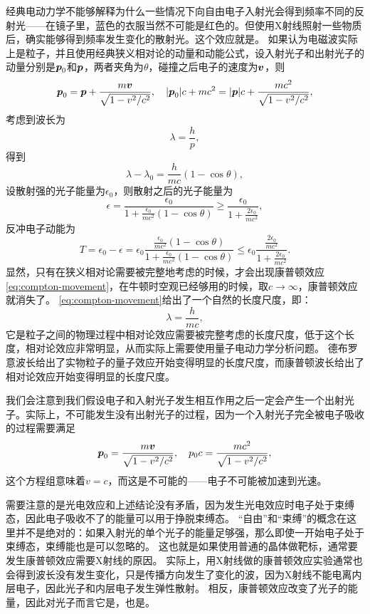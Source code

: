 经典电动力学不能够解释为什么一些情况下向自由电子入射光会得到频率不同的反射光——在镜子里，蓝色的衣服当然不可能是红色的。但使用X射线照射一些物质后，确实能够得到频率发生变化的散射光。这个效应就是。
如果认为电磁波实际上是粒子，并且使用经典狭义相对论的动量和动能公式，设入射光子和出射光子的动量分别是$\vb*{p}_0$和$\vb*{p}$，两者夹角为$\theta$，碰撞之后电子的速度为$\vb*{v}$，则
\[
    \vb*{p}_0 = \vb*{p} + \frac{m \vb*{v}}{\sqrt{1 - v^2/c^2}}, \quad \abs{\vb*{p}_0} c + m c^2 = \abs{\vb*{p}} c + \frac{m c^2}{\sqrt{1 - v^2/c^2}},
\]
考虑到波长为
\[
    \lambda = \frac{h}{p},
\]
得到
\begin{equation}
    \lambda - \lambda_0 = \frac{h}{mc} (1 - \cos \theta),
    \label{eq:compton-movement}
\end{equation}
设散射强的光子能量为$\epsilon_0$，则散射之后的光子能量为
\begin{equation}
    \epsilon = \frac{\epsilon_0}{1 + \frac{\epsilon_0}{m c^2} (1 - \cos \theta)} \geq \frac{\epsilon_0}{1 + \frac{2\epsilon_0}{m c^2}},
\end{equation}
反冲电子动能为
\begin{equation}
    T = \epsilon_0 - \epsilon = \epsilon_0 \frac{\frac{\epsilon_0}{mc^2}(1-\cos \theta)}{1+\frac{\epsilon_0}{mc^2}(1-\cos \theta)} \leq \epsilon_0 \frac{\frac{2 \epsilon_0}{mc^2}}{1+\frac{2 \epsilon_0}{mc^2}}.
\end{equation}
显然，只有在狭义相对论需要被完整地考虑的时候，才会出现康普顿效应\eqref{eq:compton-movement}，在牛顿时空观已经够用的时候，取$c \to \infty$，康普顿效应就消失了。
\eqref{eq:compton-movement}给出了一个自然的长度尺度，即：
\begin{equation}
    \lambda = \frac{h}{mc},
\end{equation}
它是粒子之间的物理过程中相对论效应需要被完整考虑的长度尺度，低于这个长度，相对论效应非常明显，从而实际上需要使用量子电动力学分析问题。
德布罗意波长给出了实物粒子的量子效应开始变得明显的长度尺度，而康普顿波长给出了相对论效应开始变得明显的长度尺度。

我们会注意到我们假设电子和入射光子发生相互作用之后一定会产生一个出射光子。实际上，不可能发生没有出射光子的过程，因为一个入射光子完全被电子吸收的过程需要满足
\[
    \vb*{p}_0 = \frac{m \vb*{v}}{\sqrt{1 - v^2/c^2}}, \quad p_0 c = \frac{m c^2}{\sqrt{1 - v^2 / c^2}},
\]
这个方程组意味着$v=c$，而这是不可能的——电子不可能被加速到光速。

需要注意的是光电效应和上述结论没有矛盾，因为发生光电效应时电子处于束缚态，因此电子吸收不了的能量可以用于挣脱束缚态。
“自由”和“束缚”的概念在这里并不是绝对的：如果入射光的单个光子的能量足够强，那么即使一开始电子处于束缚态，束缚能也是可以忽略的。
这也就是如果使用普通的晶体做靶标，通常要发生康普顿效应需要X射线的原因。
实际上，用X射线做的康普顿效应实验通常也会得到波长没有发生变化，只是传播方向发生了变化的波，因为X射线不能电离内层电子，因此光子和内层电子发生弹性散射。
相反，康普顿效应改变了光子的能量，因此对光子而言它是，也是。

